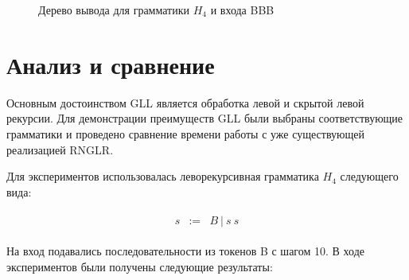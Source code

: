 \begin{figure}[h]
\caption{Дерево вывода для грамматики $H_4$ и входа BBB}
\label{fig9}
\end{figure}

\section{Анализ и сравнение}
Основным достоинством GLL является обработка левой и скрытой левой рекурсии. Для демонстрации преимуществ GLL были выбраны соответствующие грамматики и проведено сравнение времени работы с уже существующей реализацией RNGLR. 

Для экспериментов использовалась леворекурсивная грамматика $H_4$ следующего вида:

\begin{align*}
\begin{array}{ccc} s & := & B \ | \ s \ s \end{array}
\end{align*}

На вход подавались последовательности из токенов B с шагом 10. В ходе экспериментов были получены следующие результаты:

\begin{figure}[h]
\label{fig11}
\end{figure}

